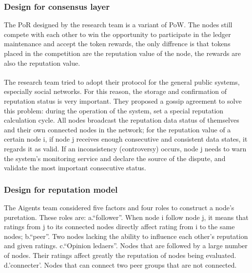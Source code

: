 \documentclass[]{article}
\begin{document}
\begin{CJK*}{UTF8}{gbsn}
	\subsubsection*{Design for consensus layer}  
	The PoR designed by the research team is a variant of PoW. The nodes still compete with each other to win the opportunity to participate in the ledger maintenance and accept the token rewards, the only diffrence is that tokens placed in the competition are the reputation value of the node, the rewards are also the reputation value.
	\paragraph{}
	The research team tried to adopt their protocol for the general public systems, especially social networks. For this reason, the storage and confirmation of reputation status is very important. They proposed a gossip agreement to solve this problem: during the operation of the system, set a special reputation calculation cycle. All nodes broadcast the reputation data status of themselves and their own connected nodes in the network; for the reputation value of a certain node i, if node j receives enough consecutive and consistent data states, it regards it as valid. If an inconsistency (controversy) occurs, node j needs to warn the system's monitoring service and declare the source of the dispute, and validate the most important consecutive status.
	\subsubsection*{Design for reputation model}
	The Aigents team considered five factors and four roles to construct a node's puretation. These roles are: a.``follower''. When node i follow node j, it means that ratings from j to its connected nodes directly affect rating from i to the same nodes; b.``peer''. Two nodes lacking the ability to influence each other's reputation and given ratings. c.``Opinion ledaers''. Nodes that are followed by a large number of nodes. Their ratings affect greatly the reputation of nodes being evaluated. d.'connecter'. Nodes that can connect two peer groups that are not connected.

\end{CJK*}
\end{document}
